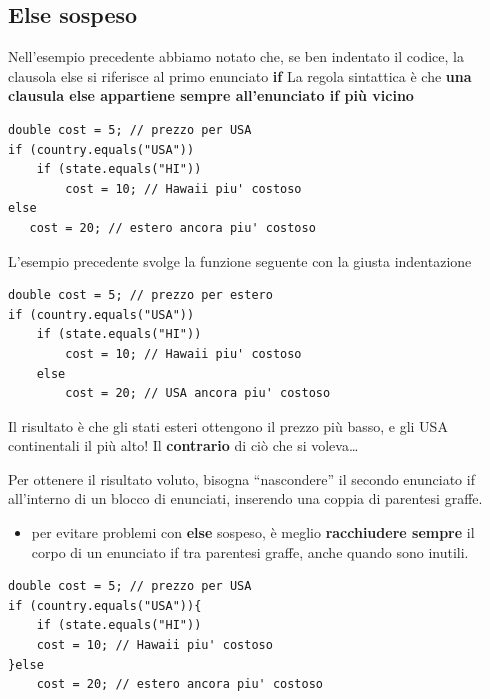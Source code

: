 \subsection*{Else sospeso}
\begin{frame}[fragile]
\begin{block}{}
Nell'esempio precedente abbiamo notato che, se ben indentato il codice, la clausola else si riferisce al primo enunciato \textbf{if}
La regola sintattica è che \textbf{una clausula else appartiene sempre all'enunciato if più vicino}
\end{block}
\begin{lstlisting}
double cost = 5; // prezzo per USA
if (country.equals("USA"))
    if (state.equals("HI"))
        cost = 10; // Hawaii piu' costoso
else
   cost = 20; // estero ancora piu' costoso
\end{lstlisting}
\end{frame}

\begin{frame}[fragile]
\begin{block}{}
L'esempio precedente svolge la funzione seguente con la giusta indentazione
\end{block}
\begin{lstlisting}
double cost = 5; // prezzo per estero
if (country.equals("USA"))
    if (state.equals("HI"))
        cost = 10; // Hawaii piu' costoso
    else
        cost = 20; // USA ancora piu' costoso
\end{lstlisting}
\begin{block}{}
Il risultato è che gli stati esteri ottengono il prezzo più basso, e gli USA continentali il più alto! Il \textbf{contrario} di ciò che 
si voleva\ldots
\end{block}
\end{frame}

\begin{frame}[fragile]
Per ottenere il risultato voluto, bisogna ``nascondere'' il secondo enunciato if all'interno di un blocco di enunciati, inserendo una 
coppia di parentesi graffe.
\begin{itemize}
\item per evitare problemi con \textbf{else} sospeso, è meglio \textbf{\alert{racchiudere sempre}} il corpo di un enunciato if tra 
parentesi graffe, anche quando sono inutili.
\end{itemize}
\begin{lstlisting}
double cost = 5; // prezzo per USA
if (country.equals("USA")){ 
    if (state.equals("HI"))
    cost = 10; // Hawaii piu' costoso
}else
    cost = 20; // estero ancora piu' costoso
\end{lstlisting}
\end{frame}

